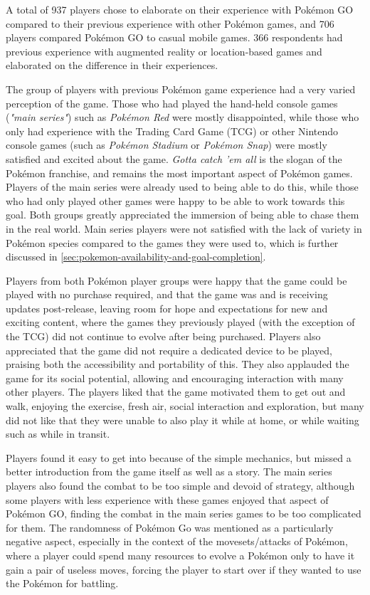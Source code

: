 A total of 937 players chose to elaborate on their experience with Pokémon GO compared to their previous experience with other Pokémon games, and 706 players compared Pokémon GO to casual mobile games. 366 respondents had previous experience with augmented reality or location-based games and elaborated on the difference in their experiences.

The group of players with previous Pokémon game experience had a very varied perception of the game. Those who had played the hand-held console games (\emph{"main series"}) such as \emph{Pokémon Red} were mostly disappointed, while those who only had experience with the Trading Card Game (TCG) or other Nintendo console games (such as \emph{Pokémon Stadium} or \emph{Pokémon Snap}) were mostly satisfied and excited about the game. \emph{Gotta catch 'em all} is the slogan of the Pokémon franchise, and remains the most important aspect of Pokémon games. Players of the main series were already used to being able to do this, while those who had only played other games were happy to be able to work towards this goal. Both groups greatly appreciated the immersion of being able to chase them in the real world. Main series players were not satisfied with the lack of variety in Pokémon species compared to the games they were used to, which is further discussed in \ref{sec:pokemon-availability-and-goal-completion}.

Players from both Pokémon player groups were happy that the game could be played with no purchase required, and that the game was and is receiving updates post-release, leaving room for hope and expectations for new and exciting content, where the games they previously played (with the exception of the TCG) did not continue to evolve after being purchased. Players also appreciated that the game did not require a dedicated device to be played, praising both the accessibility and portability of this. They also applauded the game for its social potential, allowing and encouraging interaction with many other players. The players liked that the game motivated them to get out and walk, enjoying the exercise, fresh air, social interaction and exploration, but many did not like that they were unable to also play it while at home, or while waiting such as while in transit.

Players found it easy to get into because of the simple mechanics, but missed a better introduction from the game itself as well as a story. The main series players also found the combat to be too simple and devoid of strategy, although some players with less experience with these games enjoyed that aspect of Pokémon GO, finding the combat in the main series games to be too complicated for them. The randomness of Pokémon Go was mentioned as a particularly negative aspect, especially in the context of the movesets/attacks of Pokémon, where a player could spend many resources to evolve a Pokémon only to have it gain a pair of useless moves, forcing the player to start over if they wanted to use the Pokémon for battling.

